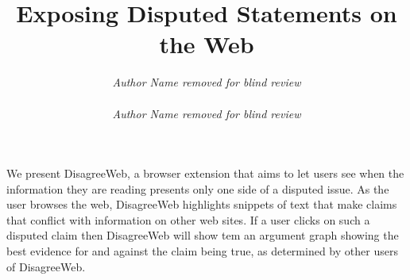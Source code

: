 \documentclass{chi2009}
\begin{document}

\toappear{}



\title{Exposing Disputed Statements on the Web}


\author{
\parbox[t]{9cm}{\centering
	     {\em Author Name removed for blind review}\\
}
\parbox[t]{9cm}{\centering
	     {\em Author Name removed for blind review}}
}

\maketitle


\abstract
We present DisagreeWeb, a browser extension that aims to let users see when the information they are reading presents only one side of a disputed issue. As the user browses the web, DisagreeWeb highlights snippets of text that make claims that conflict with information on other web sites. If a user clicks on such a disputed claim then DisagreeWeb will show tem an argument graph showing the best evidence for and against the claim being true, as determined by other users of DisagreeWeb.




\end{document}
